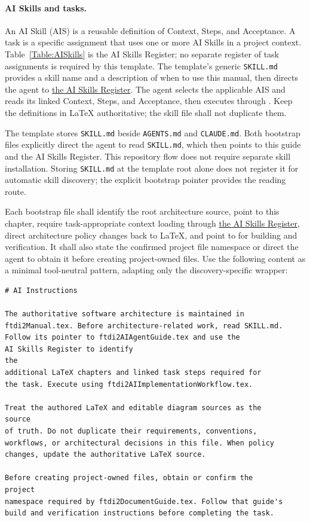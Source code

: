 \paragraph{AI Skills and tasks.}
An AI Skill (AIS) is a reusable definition of Context, Steps, and Acceptance.
A task is a specific assignment that uses one or more AI Skills in a project
context. Table~\ref{Table:AISkills} is the AI Skills Register; no separate
register of task assignments is required by this template.
The template's generic \texttt{SKILL.md} provides a skill name and a description
of when to use this manual, then directs the agent to
\hyperref[Table:AISkills]{the AI Skills Register}. The agent selects the
applicable AIS and reads its linked Context, Steps, and Acceptance, then
executes through . Keep the definitions
in LaTeX authoritative; the skill file shall not duplicate them.

The template stores \texttt{SKILL.md} beside \texttt{AGENTS.md} and
\texttt{CLAUDE.md}. Both bootstrap files explicitly direct the agent to read
\texttt{SKILL.md}, which then points to this guide and the AI Skills Register.
This repository flow does not require separate skill installation. Storing
\texttt{SKILL.md} at the template root alone does not register it for automatic
skill discovery; the explicit bootstrap pointer provides the reading route.

Each bootstrap file shall identify the root architecture source, point to this
chapter, require task-appropriate context loading through
\hyperref[Table:AISkills]{the AI Skills Register}, direct architecture
policy changes back to LaTeX, and point to  for
building and verification. It shall also state the confirmed project file
namespace or direct the agent to obtain it before creating project-owned files.
Use the following content as a minimal tool-neutral pattern, adapting only the
discovery-specific wrapper:

\begin{verbatim}
# AI Instructions

The authoritative software architecture is maintained in
ftdi2Manual.tex. Before architecture-related work, read SKILL.md.
Follow its pointer to ftdi2AIAgentGuide.tex and use the
AI Skills Register to identify
the
additional LaTeX chapters and linked task steps required for
the task. Execute using ftdi2AIImplementationWorkflow.tex.

Treat the authored LaTeX and editable diagram sources as the
source
of truth. Do not duplicate their requirements, conventions,
workflows, or architectural decisions in this file. When policy
changes, update the authoritative LaTeX source.

Before creating project-owned files, obtain or confirm the
project
namespace required by ftdi2DocumentGuide.tex. Follow that guide's
build and verification instructions before completing the task.
\end{verbatim}

